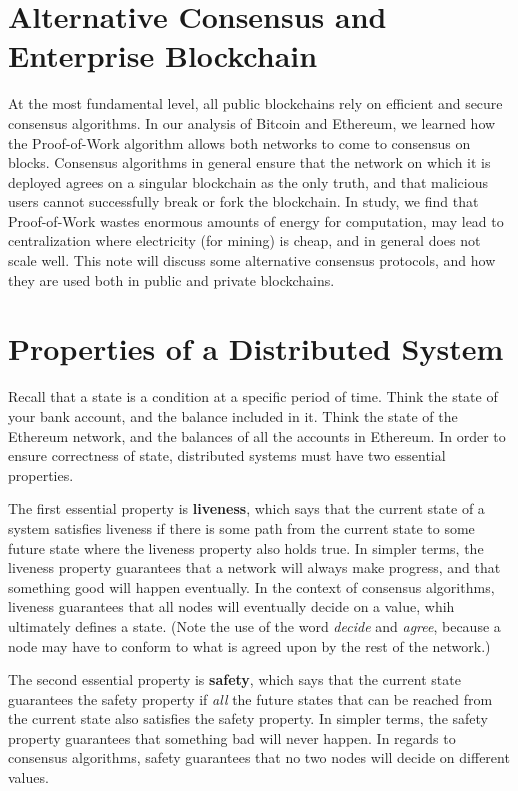 \documentclass[full.tex]{subfiles}
\begin{document}
    \thispagestyle{firstpage}
    \vspace*{2\baselineskip}
    \section*{Alternative Consensus and Enterprise Blockchain}
    
    At the most fundamental level, all public blockchains rely on efficient and secure consensus algorithms. In our analysis of Bitcoin and Ethereum, we learned how the Proof-of-Work algorithm allows both networks to come to consensus on blocks. Consensus algorithms in general ensure that the network on which it is deployed agrees on a singular blockchain as the only truth, and that malicious users cannot successfully break or fork the blockchain. In study, we find that Proof-of-Work wastes enormous amounts of energy for computation, may lead to centralization where electricity (for mining) is cheap, and in general does not scale well. This note will discuss some alternative consensus protocols, and how they are used both in public and private blockchains.
    
    \section*{Properties of a Distributed System}
    
    Recall that a state is a condition at a specific period of time. Think the state of your bank account, and the balance included in it. Think the state of the Ethereum network, and the balances of all the accounts in Ethereum. In order to ensure correctness of state, distributed systems must have two essential properties.
    
    The first essential property is \textbf{liveness}, which says that the current state of a system satisfies liveness if there is some path from the current state to some future state where the liveness property also holds true. In simpler terms, the liveness property guarantees that a network will always make progress, and that something good will happen eventually. In the context of consensus algorithms, liveness guarantees that all nodes will eventually decide on a value, whih ultimately defines a state. (Note the use of the word \textit{decide} and \textit{agree}, because a node may have to conform to what is agreed upon by the rest of the network.)
    
    The second essential property is \textbf{safety}, which says that the current state guarantees the safety property if \textit{all} the future states that can be reached from the current state also satisfies the safety property. In simpler terms, the safety property guarantees that something bad will never happen. In regards to consensus algorithms, safety guarantees that no two nodes will decide on different values.
    
\end{document}
